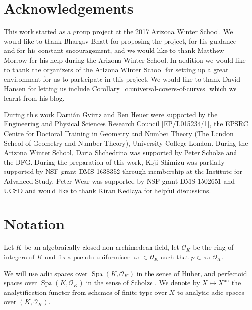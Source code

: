 \documentclass[10pt,oneside]{amsart}
\theoremstyle{definition}
\newcommand{\an}{\mathrm{an}}
\renewcommand{\O}{\mathcal{O}}
\begin{document}
 
 
 \section*{Acknowledgements}
 This work started as a group project at the 2017 Arizona Winter School. We would like to thank Bhargav Bhatt for proposing the project, for his guidance and for his constant encouragement, and we would like to thank Matthew Morrow for his help during the Arizona Winter School. In addition we would like to thank the organizers of the Arizona Winter School for setting up a great environment for us to participate in this project. We would like to thank David Hansen for letting us include Corollary~\ref{c:universal-covers-of-curves} which we learnt from his blog.
 
 During this work Dami\'an Gvirtz and Ben Heuer were supported by the Engineering and Physical Sciences Research Council [EP/L015234/1], the EPSRC Centre for Doctoral Training in Geometry and Number Theory (The London School of Geometry and Number Theory), University College London. 
 During the Arizona Winter School, Daria Shchedrina was supported by Peter Scholze and the DFG.
During the preparation of this work, Koji Shimizu was partially supported by NSF grant DMS-1638352 through membership at the Institute for Advanced Study.
 Peter Wear was supported by NSF grant DMS-1502651 and UCSD and would like to thank Kiran Kedlaya for helpful discussions.


\section*{Notation}
	Let $K$ be an algebraically closed non-archimedean field, let $\mathcal O_K$ be the ring of integers of $K$ and fix a pseudo-uniformiser $\varpi\in \mathcal O_K$ such that $p\in\varpi\mathcal O_K$. 
	
	We will use adic spaces over $\operatorname{Spa}(K,\O_K)$ in the sense of Huber, and perfectoid spaces over $\operatorname{Spa}(K,\O_K)$ in the sense of Scholze \cite{perfectoid}. We denote by $X\mapsto X^{\an}$ the analytification functor from schemes of finite type over $X$ to analytic adic spaces over $(K,\O_K)$.
	
\end{document}
